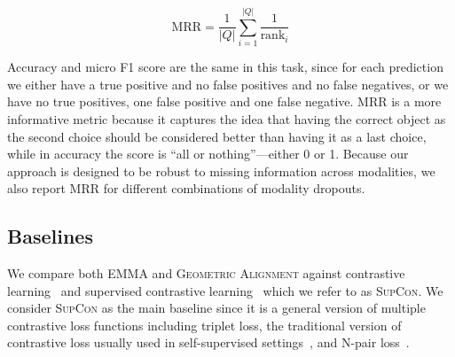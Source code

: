 \documentclass[10pt]{article} %
\newcommand{\ours}{\textsc{EMMA}}
\newcommand{\geom}{\textsc{Geometric Alignment}}
\newcommand{\supcon}{\textsc{SupCon}}
\begin{document}
\begin{equation} \label{eq:mrr}
    \mathrm{MRR}=\frac{1}{|Q|} \sum_{i=1}^{|Q|} \frac{1}{\operatorname{rank}_{i}}
\end{equation}

Accuracy and micro F1 score
are the same in this task, since for each prediction we either have a true positive and no false positives and no false negatives, or we have no true positives, one false positive and one false negative. MRR is a more informative metric because it captures the idea that having the correct object as the second choice should be considered better than having it as a last choice, while in accuracy the score is ``all or nothing''---either 0 or 1. Because our approach is designed to be robust to missing information across modalities, we also report MRR for different combinations of modality dropouts. 


\subsection{Baselines}
We compare both \ours{} and \geom{} against contrastive learning~\cite{chen2020simple} and supervised contrastive learning~\cite{NEURIPS2020_supervised_contrastive} which we refer to as \supcon{}.
We consider \supcon{} as the main baseline since it is a general version of multiple contrastive loss functions including triplet loss, the traditional version of contrastive loss usually used in self-supervised settings~\cite{chen2020simple}, and N-pair loss~\cite{NIPS2016N-PairLoss}.
\end{document}
